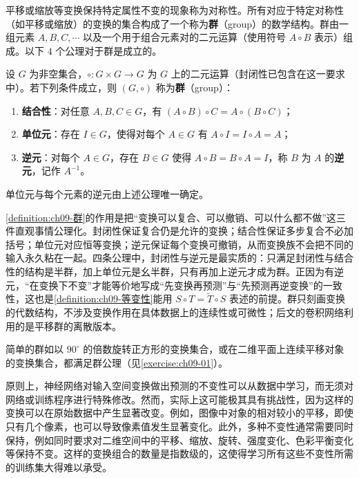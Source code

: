 \documentclass[../../main.tex]{subfiles}
\begin{document}
平移或缩放等变换保持特定属性不变的现象称为对称性。所有对应于特定对称性（如平移或缩放）的变换的集合构成了一个称为\textbf{群}（group）的数学结构。群由一组元素 $A,B,C,\cdots$ 以及一个用于组合元素对的二元运算（使用符号 $A\circ B$ 表示）组成。以下 $4$ 个公理对于群是成立的。

\begin{definition}[群]\label{definition:ch09-群}
设 $G$ 为非空集合，$\circ:G\times G\to G$ 为 $G$ 上的二元运算（封闭性已包含在这一要求中）。若下列条件成立，则 $(G,\circ)$ 称为\textbf{群}（group）：
\begin{enumerate}
\item \textbf{结合性}：对任意 $A,B,C\in G$，有 $(A\circ B)\circ C=A\circ(B\circ C)$；
\item \textbf{单位元}：存在 $I\in G$，使得对每个 $A\in G$ 有 $A\circ I=I\circ A=A$；
\item \textbf{逆元}：对每个 $A\in G$，存在 $B\in G$ 使得 $A\circ B=B\circ A=I$，称 $B$ 为 $A$ 的\textbf{逆元}，记作 $A^{-1}$。
\end{enumerate}
单位元与每个元素的逆元由上述公理唯一确定。
\end{definition}

\begin{remark}\cref{definition:ch09-群}的作用是把“变换可以复合、可以撤销、可以什么都不做”这三件直观事情公理化。封闭性保证复合仍是允许的变换；结合性保证多步复合不必加括号；单位元对应恒等变换；逆元保证每个变换可撤销，从而变换族不会把不同的输入永久粘在一起。四条公理中，封闭性与逆元是最实质的：只满足封闭性与结合性的结构是半群，加上单位元是幺半群，只有再加上逆元才成为群。正因为有逆元，“在变换下不变”才能等价地写成“先变换再预测”与“先预测再逆变换”的一致性，这也是\cref{definition:ch09-等变性}能用 $S\circ T=\tilde T\circ S$ 表述的前提。群只刻画变换的代数结构，不涉及变换作用在具体数据上的连续性或可微性；后文的卷积网络利用的是平移群的离散版本。
\end{remark}

简单的群如以 $90^{\circ}$ 的倍数旋转正方形的变换集合，或在二维平面上连续平移对象的变换集合，都满足群公理（见\cref{exercise:ch09-01}）。

原则上，神经网络对输入空间变换做出预测的不变性可以从数据中学习，而无须对网络或训练程序进行特殊修改。然而，实际上这可能极其具有挑战性，因为这样的变换可以在原始数据中产生显著改变。例如，图像中对象的相对较小的平移，即使只有几个像素，也可以导致像素值发生显著变化。此外，多种不变性通常需要同时保持，例如同时要求对二维空间中的平移、缩放、旋转、强度变化、色彩平衡变化等保持不变。这样的变换组合的数量是指数级的，这使得学习所有这些不变性所需的训练集大得难以承受。
\end{document}

